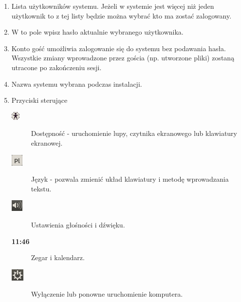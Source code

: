 \begin{enumerate}
\item Lista użytkowników systemu. Jeżeli w systemie jest więcej niż jeden użytkownik to z tej listy będzie można wybrać kto ma zostać zalogowany.
\item W to pole wpisz hasło aktualnie wybranego użytkownika.
\item Konto gość umożliwia zalogowanie się do systemu bez podawania hasła. Wszystkie zmiany wprowadzone przez gościa (np. utworzone pliki) zostaną utracone po zakończeniu sesji.
\item Nazwa systemu wybrana podczas instalacji.
\item Przyciski sterujące
\begin{description}
\item[\includegraphics{images/ikony_dostempnosc2.png}]Dostępność - uruchomienie lupy, czytnika ekranowego lub klawiatury ekranowej.
\item[\includegraphics{images/ikony_jezyk.png}]Język - pozwala zmienić układ klawiatury i metodę wprowadzania tekstu.
\item[\includegraphics{images/ikony_dzwiek.png}]Ustawienia głośności i dźwięku.
\item[\textbf{11:46}] Zegar i kalendarz.
\item[\includegraphics{images/ikony_zasilanie.png}]Wyłączenie lub ponowne uruchomienie komputera.
\end{description}
\end{enumerate}
\clearpage

